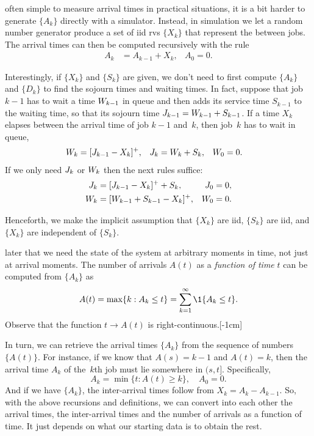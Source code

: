 \documentclass[stochastic-or.tex]{subfiles}
\begin{document}
often simple to measure arrival times in practical situations, it is a bit harder to generate $\{A_{k}\}$ directly with a simulator. Instead, in simulation we let a random number generator produce a set of iid rvs $\{X_{k}\}$ that represent the  between jobs. The arrival times can then be computed recursively with the rule
\begin{align}\label{eq:qc-4}
 A_k &= A_{k-1} + X_k, &   A_{0} = 0.
 \end{align}

Interestingly, if  $\{X_{k}\}$ and $\{S_{k}\}$ are given, we don't need to first compute $\{A_{k}\}$ and $\{D_{k}\}$  to find the sojourn times and waiting  times. In fact,
suppose that job $k-1$ has to wait a time $W_{k-1}$ in queue and then adds its service time $S_{k-1}$ to the waiting time, so that its sojourn time $J_{k-1} =W_{k-1}+ S_{k-1}$. If a time $X_k$ elapses between the arrival time of job $k-1$ and~$k$, then job~$k$ has to wait in queue,
\begin{align}\label{eq:56}
 W_{k} &= [J_{k-1} -X_k]^+, & J_{k} &= W_{k} + S_{k}, & W_{0} &= 0.
\end{align}
If we only need  $J_k$ or $W_{k}$ then the next rules suffice:
\begin{align}\label{eq:59}
J_{k} &= [J_{k-1} - X_k]^+ + S_k, & J_{0} &=0, \\
W_{k} &= [W_{k-1} + S_{k-1}- X_k]^+, & W_{0} &=0.
\end{align}

Henceforth, we  make the  implicit assumption  that  $\{X_k\}$ are iid,  $\{S_k\}$ are iid, and $\{X_k\}$ are independent of $\{S_k\}$.

 later that we need the state of the system at arbitrary moments in time, not just at arrival moments.
The number of arrivals $A(t)$ as a \emph{function of time} $t$ can be computed from $\{A_{k}\}$ as
\begin{equation} \label{eq:2}
 A(t) = \max\{k: A_k \leq t\} = \sum_{k=1}^{\infty}\1{A_k\leq t}.
\end{equation}
Observe that the function $t\to A(t)$ is right-continuous.[-1cm]

In turn, we can retrieve the arrival times $\{A_{k}\}$ from the sequence of numbers $\{A(t)\}$.
For instance, if we know that $A(s) = k-1$ and $A(t) = k$, then the arrival time $A_k$ of the~$k$th job must lie somewhere in $(s,t]$.
Specifically,
\begin{equation*}
 A_k = \min\{t: A(t) \geq k\}, \quad A_0 = 0.
\end{equation*}
And if we have $\{A_{k}\}$,  the inter-arrival times follow from $X_k = A_k - A_{k-1}$. So, with the above recursions and definitions, we can convert into each other the arrival times, the inter-arrival times and the number of arrivals as a function of time. It just depends on what our starting data is to obtain the rest.
\end{document}
